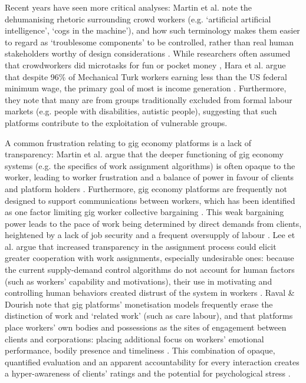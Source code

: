 Recent years have seen more critical analyses: Martin et al. note the dehumanising rhetoric surrounding crowd workers (e.g. `artificial artificial intelligence', `cogs in the machine'), and how such terminology makes them easier to regard as `troublesome components' to be controlled, rather than real human stakeholders worthy of design considerations \cite{martin2016}. While researchers often assumed that crowdworkers did microtasks for fun or pocket money \cite{martin2016}, Hara et al. argue that despite 96\% of Mechanical Turk workers earning less than the US federal minimum wage, the primary goal of most is income generation \cite{Hara2018}. Furthermore, they note that many are from groups traditionally excluded from formal labour markets (e.g. people with disabilities, autistic people), suggesting that such platforms contribute to the exploitation of vulnerable groups.

A common frustration relating to gig economy platforms is a lack of transparency: Martin et al. argue that the deeper functioning of gig economy systems (e.g. the specifics of work assignment algorithms) is often opaque to the worker, leading to worker frustration and a balance of power in favour of clients and platform holders \cite{martin2016}. Furthermore, gig economy platforms are frequently not designed to support communications between workers, which has been identified as one factor limiting gig worker collective bargaining \cite{Hara2018}. This weak bargaining power leads to the pace of work being determined by direct demands from clients, heightened by a lack of job security and a frequent oversupply of labour \cite{Wood2019}. Lee et al. argue that increased transparency in the assignment process could elicit greater cooperation with work assignments, especially undesirable ones: because the current supply-demand control algorithms do not account for human factors (such as workers' capability and motivations), their use in motivating and controlling human behaviors created distrust of the system in workers \cite{lee2015}. Raval \& Dourish note that gig platforms' monetisation models frequently erase the distinction of work and `related work' (such as care labour), and that platforms place workers' own bodies and possessions as the sites of engagement between clients and corporations: placing additional focus on workers' emotional performance, bodily presence and timeliness \cite{raval2016}. This combination of opaque, quantified evaluation and an apparent accountability for every interaction creates a hyper-awareness of clients' ratings and the potential for psychological stress \cite{lee2015}.

